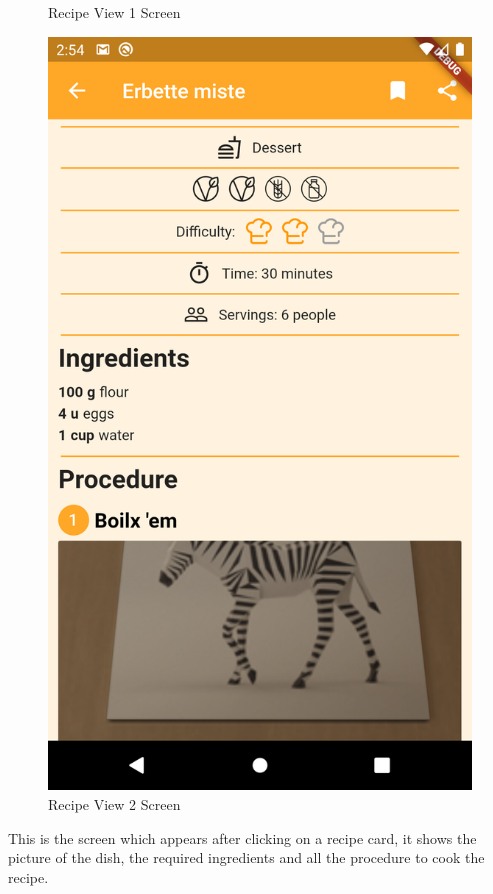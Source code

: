 \begin{figure}
\begin{minipage}{0.48\textwidth}
		\caption{Recipe View 1 Screen}
	\end{minipage}\hfill
	\begin{minipage}{0.48\textwidth}
		\centering
		\includegraphics{img/RecipeView_2.png}
		\caption{Recipe View 2 Screen}
	\end{minipage}
\end{figure}
This is the screen which appears after clicking on a recipe card, it shows the picture of the dish, the required ingredients and all the procedure to cook the recipe.
